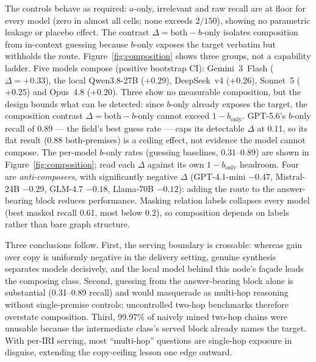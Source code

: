 \documentclass[10pt,twocolumn]{article}
\begin{document}
The controls behave as required: $a$-only, irrelevant and raw recall are at floor for every
model (zero in almost all cells; none exceeds $2/150$), showing no parametric leakage or placebo
effect. The contrast $\Delta=\text{both}-b\text{-only}$ isolates composition from in-context
guessing because $b$-only exposes the target verbatim but withholds the route.
Figure~\ref{fig:composition} shows three groups, not a capability ladder. Five models compose
(positive bootstrap CI): Gemini~3~Flash ($\Delta=+0.33$), the local Qwen3.8-27B ($+0.29$),
DeepSeek~v4 ($+0.26$), Sonnet~5 ($+0.25$) and Opus~4.8 ($+0.20$). Three show no measurable
composition, but the design bounds what can be detected: since $b$-only already exposes the
target, the composition contrast $\Delta=\text{both}-b\text{-only}$ cannot exceed $1-b_{\text{only}}$.
GPT-5.6's $b$-only recall of 0.89 --- the field's best guess rate --- caps its detectable $\Delta$
at 0.11, so its flat result (0.88 both-premises) is a ceiling effect, not evidence the model
cannot compose. The per-model $b$-only rates (guessing baselines, $0.31$--$0.89$) are shown in
Figure~\ref{fig:composition}; read each $\Delta$ against its own $1-b_{\text{only}}$ headroom.
Four are \emph{anti-composers}, with significantly
negative $\Delta$ (GPT-4.1-mini $-0.47$, Mistral-24B $-0.29$, GLM-4.7 $-0.18$, Llama-70B
$-0.12$): adding the route to the answer-bearing block reduces performance. Masking relation
labels collapses every model (best masked recall 0.61, most below 0.2), so composition depends
on labels rather than bare graph structure.

Three conclusions follow. First, the serving boundary is crossable: whereas gain over copy is
uniformly negative in the delivery setting, genuine synthesis separates models decisively, and
the local model behind this node's fa\c{c}ade leads the composing class. Second, guessing from
the answer-bearing block alone is substantial (0.31--0.89 recall) and would masquerade as
multi-hop reasoning without single-premise controls; uncontrolled two-hop benchmarks therefore
overstate composition. Third, 99.97\% of naively mined two-hop chains were unusable because the
intermediate class's served block already names the target. With per-IRI serving, most
``multi-hop'' questions are single-hop exposure in disguise, extending the copy-ceiling lesson
one edge outward.
\end{document}
